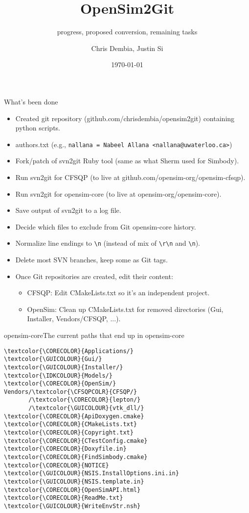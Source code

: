 \documentclass[pdf, 8pt]{beamer}
\title{OpenSim2Git}
\subtitle{progress, proposed conversion, remaining tasks}
\author{Chris Dembia, Justin Si}
\date{\today}
\def\GUICOLOUR{black}
\def\CORECOLOR{green!60!black}
\def\IDKCOLOUR{orange}
\def\CFSQPCOLR{black}
\begin{document}
\begin{frame}[fragile]{What's been done}

\begin{itemize}
\item Created git repository (github.com/chrisdembia/opensim2git) containing
    python scripts.
\item authors.txt (e.g., \verb|nallana = Nabeel Allana <nallana@uwaterloo.ca>|)
\item Fork/patch of svn2git Ruby tool (same as what Sherm used for Simbody).
\item Run svn2git for CFSQP (to live at github.com/opensim-org/opensim-cfsqp).
\item Run svn2git for opensim-core (to live at opensim-org/opensim-core).
\item Save output of svn2git to a log file.
\item Decide which files to exclude from Git opensim-core history.
\item Normalize line endings to \verb|\n| (instead of mix of \verb|\r\n| and
\verb|\n|).
\item Delete most SVN branches, keep some as Git tags.
\item Once Git repositories are created, edit their content:
    \begin{itemize}
    \item CFSQP: Edit CMakeLists.txt so it's an independent project.
    \item OpenSim: Clean up CMakeLists.txt for removed directories (Gui, Installer,
    Vendors/CFSQP, ...).
    \end{itemize}
\end{itemize}
\end{frame}

\begin{frame}[fragile]{opensim-core}{The current paths that end up in
    opensim-core}
\begin{Verbatim}
\textcolor{\CORECOLOR}{Applications/}
\textcolor{\GUICOLOUR}{Gui/}
\textcolor{\GUICOLOUR}{Installer/}
\textcolor{\IDKCOLOUR}{Models/}
\textcolor{\CORECOLOR}{OpenSim/}
Vendors/\textcolor{\CFSQPCOLR}{CFSQP/}
       /\textcolor{\CORECOLOR}{lepton/}
       /\textcolor{\GUICOLOUR}{vtk_dll/}
\textcolor{\CORECOLOR}{ApiDoxygen.cmake}
\textcolor{\CORECOLOR}{CMakeLists.txt}
\textcolor{\CORECOLOR}{Copyright.txt}
\textcolor{\CORECOLOR}{CTestConfig.cmake}
\textcolor{\CORECOLOR}{Doxyfile.in}
\textcolor{\CORECOLOR}{FindSimbody.cmake}
\textcolor{\CORECOLOR}{NOTICE}
\textcolor{\GUICOLOUR}{NSIS.InstallOptions.ini.in}
\textcolor{\GUICOLOUR}{NSIS.template.in}
\textcolor{\CORECOLOR}{OpenSimAPI.html}
\textcolor{\CORECOLOR}{ReadMe.txt}
\textcolor{\GUICOLOUR}{WriteEnvStr.nsh}
\end{Verbatim}
\end{frame}
\end{document}
